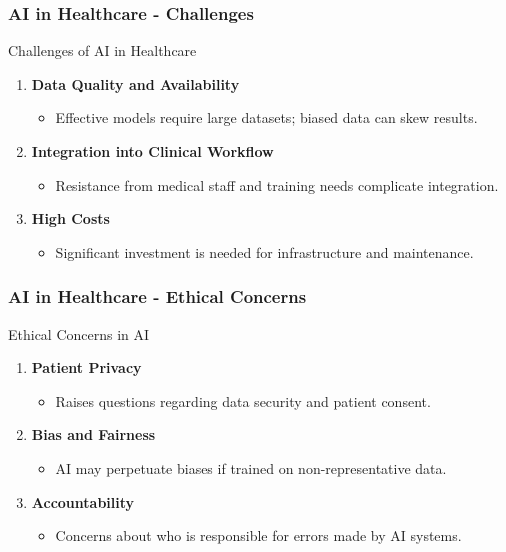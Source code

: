 \documentclass[aspectratio=169]{beamer}
\begin{document}
\begin{frame}[fragile]
    \frametitle{AI in Healthcare - Challenges}
    \begin{block}{Challenges of AI in Healthcare}
        \begin{enumerate}
            \item \textbf{Data Quality and Availability}
                \begin{itemize}
                    \item Effective models require large datasets; biased data can skew results.
                \end{itemize}
            \item \textbf{Integration into Clinical Workflow}
                \begin{itemize}
                    \item Resistance from medical staff and training needs complicate integration.
                \end{itemize}
            \item \textbf{High Costs}
                \begin{itemize}
                    \item Significant investment is needed for infrastructure and maintenance.
                \end{itemize}
        \end{enumerate}
    \end{block}
\end{frame}

\begin{frame}[fragile]
    \frametitle{AI in Healthcare - Ethical Concerns}
    \begin{block}{Ethical Concerns in AI}
        \begin{enumerate}
            \item \textbf{Patient Privacy}
                \begin{itemize}
                    \item Raises questions regarding data security and patient consent.
                \end{itemize}
            \item \textbf{Bias and Fairness}
                \begin{itemize}
                    \item AI may perpetuate biases if trained on non-representative data.
                \end{itemize}
            \item \textbf{Accountability}
                \begin{itemize}
                    \item Concerns about who is responsible for errors made by AI systems.
                \end{itemize}
        \end{enumerate}
    \end{block}
\end{frame}
\end{document}
